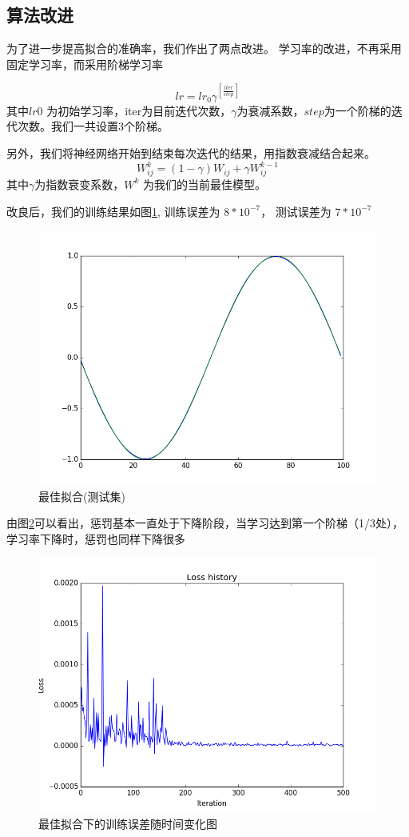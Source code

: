 \documentclass{article}
\begin{document}
\begin{CJK}{UTF8}{gkai}
\subsection{算法改进}
为了进一步提高拟合的准确率，我们作出了两点改进。
学习率的改进，不再采用固定学习率，而采用阶梯学习率

\begin{equation}
	lr = lr_0  \gamma^{[\frac{iter}{step}]}
\end{equation}
其中$lr0$ 为初始学习率，iter为目前迭代次数，$\gamma$为衰减系数，$step$为一个阶梯的迭代次数。我们一共设置3个阶梯。

另外，我们将神经网络开始到结束每次迭代的结果，用指数衰减结合起来\cite{karpathy2016cs231n}。
\begin{equation}
W^k_{ij} = (1-\gamma) W_{ij}  + \gamma W^{k-1}_{ij}
\end{equation}
其中$\gamma$为指数衰变系数，$W^k$ 为我们的当前最佳模型。

改良后，我们的训练结果如图\ref{fig:fig2}, 训练误差为 $8*10^{-7}$， 测试误差为 $7*10^{-7}$
\begin{figure}
	\centering
	\includegraphics[width=.8\linewidth]{../fig2}
	\caption{最佳拟合(测试集)}
	\label{fig:fig2}
\end{figure}

由图\ref{fig:loss}可以看出，惩罚基本一直处于下降阶段，当学习达到第一个阶梯（1/3处），学习率下降时，惩罚也同样下降很多
\begin{figure}[h]
	\centering
	\includegraphics[width=.8\linewidth]{../loss}
	\caption{最佳拟合下的训练误差随时间变化图}
	\label{fig:loss}
\end{figure}


\end{CJK}
\end{document}
